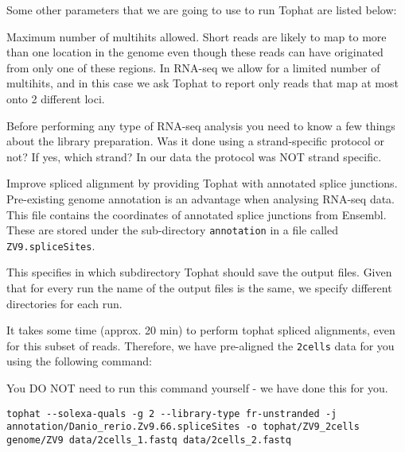 \begin{note}
Some other parameters that we are going to use to run Tophat are listed below:
\begin{description}[style=multiline,labelindent=0cm,align=right,leftmargin=\descriptionlabelspace,rightmargin=1.5cm,font=\ttfamily]
 \item[-g] Maximum number of multihits allowed. Short reads are likely to map to
 more than one location in the genome even though these reads can have originated
 from only one of these regions. In RNA-seq we allow for a limited number of
 multihits, and in this case we ask Tophat to report only reads that map at most
 onto 2 different loci.
 \item[--library-type] Before performing any type of RNA-seq analysis you need
 to know a few things about the library preparation. Was it done using a
 strand-specific protocol or not? If yes, which strand? In our data the protocol
 was NOT strand specific.
 \item[-j] Improve spliced alignment by providing Tophat with annotated splice
 junctions. Pre-existing genome annotation is an advantage when analysing RNA-seq
 data. This file contains the coordinates of annotated splice junctions from Ensembl.
 These are stored under the sub-directory \texttt{annotation} in a file called
 \texttt{ZV9.spliceSites}.
 \item[-o] This specifies in which subdirectory Tophat should save the output
 files. Given that for every run the name of the output files is the same, we
 specify different directories for each run.
\end{description}
\end{note}

It takes some time (approx. 20 min) to perform tophat spliced alignments, even for this subset of
reads. Therefore, we have pre-aligned the \texttt{2cells} data for you using the following command:
\begin{warning}
You DO NOT need to run this command yourself - we have done this for you.

\begin{lstlisting}
tophat --solexa-quals -g 2 --library-type fr-unstranded -j annotation/Danio_rerio.Zv9.66.spliceSites -o tophat/ZV9_2cells genome/ZV9 data/2cells_1.fastq data/2cells_2.fastq
\end{lstlisting}
\end{warning}


